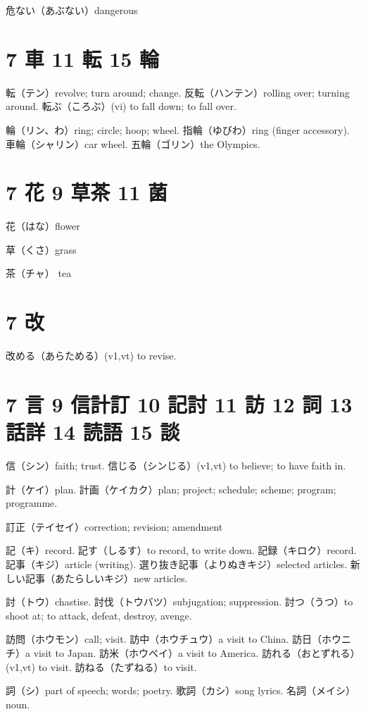 危ない（あぶない）dangerous

\section{7 車 11 転 15 輪}

転（テン）revolve; turn around; change.
反転（ハンテン）rolling over; turning around.
転ぶ（ころぶ）(vi) to fall down; to fall over.

輪（リン、わ）ring; circle; hoop; wheel.
指輪（ゆびわ）ring (finger accessory).
車輪（シャリン）car wheel.
五輪（ゴリン）the Olympics.

\section{7 花 9 草茶 11 菌}

花（はな）flower

草（くさ）grass

茶（チャ） tea

\section{7 改}

改める（あらためる）(v1,vt) to revise.

\section{7 言 9 信計訂 10 記討 11 訪 12 詞 13 話詳 14 読語 15 談}

信（シン）faith; trust.
信じる（シンじる）(v1,vt) to believe; to have faith in.

計（ケイ）plan.
計画（ケイカク）plan; project; schedule; scheme; program; programme.

訂正（テイセイ）correction; revision; amendment

記（キ）record.
記す（しるす）to record, to write down.
記録（キロク）record.
記事（キジ）article (writing).
選り抜き記事（よりぬきキジ）selected articles.
新しい記事（あたらしいキジ）new articles.

討（トウ）chastise.
討伐（トウバツ）subjugation; suppression.
討つ（うつ）to shoot at; to attack, defeat, destroy, avenge.

訪問（ホウモン）call; visit.
訪中（ホウチュウ）a visit to China.
訪日（ホウニチ）a visit to Japan.
訪米（ホウベイ）a visit to America.
訪れる（おとずれる）(v1,vt) to visit.
訪ねる（たずねる）to visit.

詞（シ）part of speech; words; poetry.
歌詞（カシ）song lyrics.
名詞（メイシ）noun.

